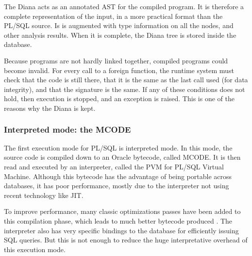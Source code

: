 \documentclass[twoside,11pt,a4paper]{article}
\begin{document}
The Diana acts as an annotated AST for the compiled program. It is therefore a complete representation of the input, in a more practical format than the PL/SQL source. Is is augmented with type information on all the nodes, and other analysis results. When it is complete, the Diana tree is stored inside the database.



Because programs are not hardly linked together, compiled programs could become invalid. For every call to a foreign function, the runtime system must check that the code is still there, that it is the same as the last call used (for data integrity), and that the signature is the same. If any of these conditions does not hold, then execution is stopped, and an exception is raised. This is one of the reasons why the Diana is kept.

\subsubsection{Interpreted mode: the MCODE}

The first execution mode for PL/SQL is interpreted mode. In this mode, the source code is compiled down to an Oracle bytecode, called MCODE. It is then read and executed by an interpreter, called the PVM for PL/SQL Virtual Machine. Although this bytecode has the advantage of being portable across databases, it has poor performance, mostly due to the interpreter not using recent technology like JIT.

To improve performance, many classic optimizations passes have been added to this compilation phase, which leads to much better bytecode produced \cite{freedomplsopt}. The interpreter also has very specific bindings to the database for efficiently issuing SQL queries. But this is not enough to reduce the huge interpretative overhead of this execution mode.
\end{document}
